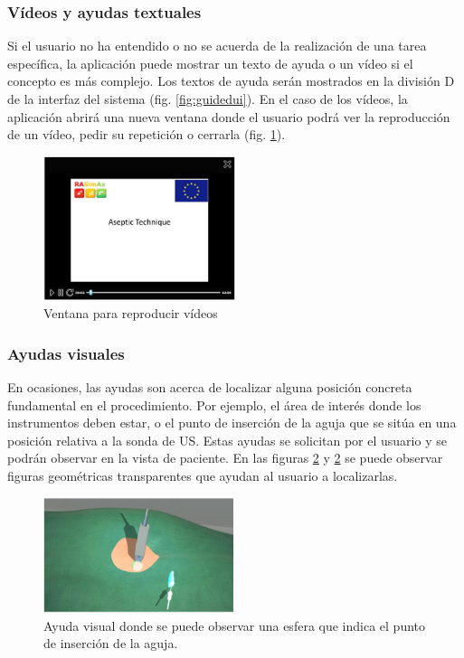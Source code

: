 \subsubsection{Vídeos y ayudas textuales}

Si el usuario no ha entendido o no se acuerda de la realización de una tarea específica, la aplicación puede mostrar un texto de ayuda o un vídeo si el concepto es más complejo. Los textos de ayuda serán mostrados en la división D de la interfaz del sistema (fig. \ref{fig:guidedui}). En el caso de los vídeos, la aplicación abrirá una nueva ventana donde el usuario podrá ver la reproducción de un vídeo, pedir su repetición o cerrarla (fig. \ref{fig:video}).

\begin{figure}[h]
    \centering
    \includegraphics[width=0.5\textwidth]{IMG/video.PNG}
    \caption{Ventana para reproducir vídeos}
    \label{fig:video}
\end{figure}
 
\subsubsection{Ayudas visuales}

 En ocasiones, las ayudas son acerca de localizar alguna posición concreta fundamental en el procedimiento. Por ejemplo, el área de interés donde los instrumentos deben estar, o el punto de inserción de la aguja que se sitúa en una posición relativa a la sonda de \ac{US}. Estas ayudas se solicitan por el usuario y se podrán observar en la vista de paciente. En las figuras \ref{fig:viewhelp} y \ref{fig:viewhelp} se puede observar figuras geométricas transparentes que ayudan al usuario a localizarlas.
 
 
 \begin{figure}[h]
    \centering
    \includegraphics[width=0.5\textwidth]{IMG/viewhelp.PNG}
    \caption{Ayuda visual donde se puede observar una esfera que indica el punto de inserción de la aguja.}
    \label{fig:viewhelp}
\end{figure}

